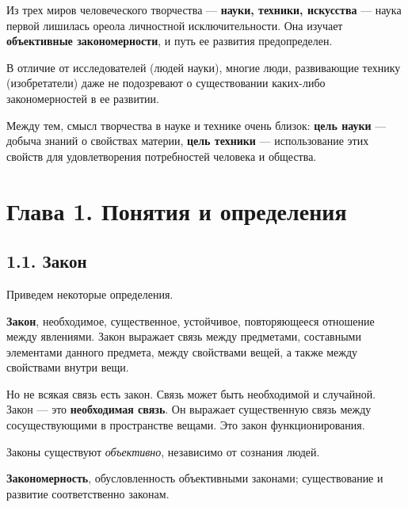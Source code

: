\documentclass[11pt,a4paper]{article}
\begin{document}
Из трех миров человеческого творчества — \textbf{науки, техники, искусства} —
наука первой лишилась ореола личностной исключительности. Она изучает
\textbf{объективные закономерности}, и путь ее развития предопределен.

В отличие от исследователей (людей науки), многие люди, развивающие технику
(изобретатели) даже не подозревают о существовании каких-либо закономерностей
в ее развитии.

Между тем, смысл творчества в науке и технике очень близок: \textbf{цель
  науки} — добыча знаний о свойствах материи, \textbf{цель техники} —
использование этих свойств для удовлетворения потребностей человека и
общества.

\section*{Глава 1. Понятия и определения}

\subsection*{1.1. Закон}

Приведем некоторые определения.

\textbf{Закон}, необходимое, существенное, устойчивое, повторяющееся отношение
между явлениями. Закон выражает связь между предметами, составными элементами
данного предмета, между свойствами вещей, а также между свойствами внутри
вещи.

Но не всякая связь есть закон. Связь может быть необходимой и случайной.
Закон — это \textbf{необходимая связь}. Он выражает существенную связь между
сосуществующими в пространстве вещами. Это закон функционирования.

Законы существуют \emph{объективно}, независимо от сознания людей.

\textbf{Закономерность}, обусловленность объективными законами; существование
и развитие соответственно законам.
\end{document}

